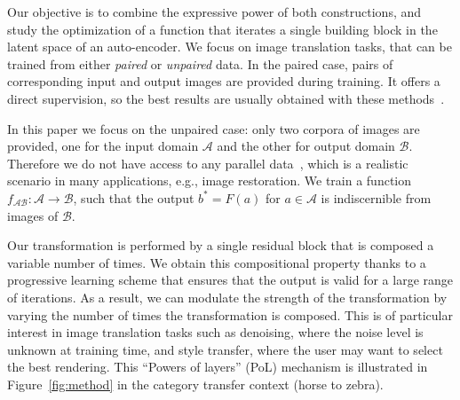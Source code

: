 \documentclass[a4paper,10pt]{extarticle}
\def\Ac{\mathcal A}
\def\Bc{\mathcal B}
\begin{document}
Our objective is to combine the expressive power of both  constructions, and study 
the optimization of a function that iterates a single building block in the latent space of an auto-encoder. 
We focus on image translation tasks, that can be trained from either \emph{paired} or \emph{unpaired} data.
In the paired case, pairs of corresponding input and output images are provided during training. It offers a direct supervision, so the best results are usually obtained with these methods~\cite{chen2017fast,wang2018pix2pixHD,park2019SPADE}.

In this paper we focus on the unpaired case: only two corpora of images are provided, one for the input domain $\Ac$ and the other for output domain $\Bc$. Therefore we do not have access to any parallel data~\cite{conneau2017word}, which is a  realistic scenario in many applications, e.g., image restoration. 
We train a function $f_{\Ac\Bc}:\Ac \rightarrow \Bc$, such that the output $b^*=F(a)$ for $a \in \Ac$ is indiscernible from images of $\Bc$. 


Our transformation is performed by a single residual block that is composed a variable number of times. 
We obtain this compositional property thanks to a progressive learning scheme that ensures that the output is valid for a large range of iterations.
As a result, we can modulate the strength of the transformation by varying the number of times the transformation is composed. This is of particular interest in image translation tasks such as denoising, where the noise level is unknown at training time, and style transfer, where the user may want to select the best rendering. 
This ``Powers of layers'' (PoL) mechanism is illustrated in Figure~\ref{fig:method} in the category transfer context (horse to zebra).
\end{document}
